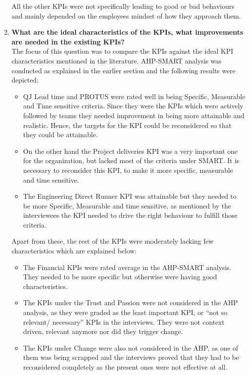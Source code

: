 \begin{enumerate}
All the other KPIs were not specifically leading to good or bad behaviours and mainly depended on the employees mindset of how they approach them.\\

\item \textbf{What are the ideal characteristics of the KPIs, what improvements are needed in the existing KPIs? }\\
The focus of this question was to compare the KPIs against the ideal KPI characteristics mentioned in the literature. AHP-SMART analysis was conducted as explained in the earlier section and the following results were depicted:
\begin{itemize}
    \item QJ Lead time and PROTUS were rated well in being Specific, Measurable and Time sensitive criteria. Since they were the KPIs which were actively followed by teams they needed improvement in being more attainable and realistic. Hence, the targets for the KPI could be reconsidered so that they could be attainable.
    \item On the other hand the Project deliveries KPI was a very important one for the organization, but lacked most of the criteria under SMART. It is necessary to reconsider this KPI, to make it more specific, measurable and time sensitive. 
    \item The Engineering Direct Runner KPI was attainable but they needed to be more Specific, Measurable and time sensitive, as mentioned by the interviewees the KPI needed to drive the right behaviour to fulfill those criteria.

\end{itemize}

Apart from these, the rest of the KPIs were moderately lacking few characteristics which are explained below:
\begin{itemize}
    \item The Financial KPIs were rated average in the AHP-SMART analysis. They needed to be more specific but otherwise were having good characteristics.
    \item The KPIs under the Trust and Passion were not considered in the AHP analysis, as they were graded as the least important KPI, or “not so relevant/ necessary” KPIs in the interviews. They were not context driven, relevant anymore nor did they trigger change. 
    \item The KPIs under Change were also not considered in the AHP, as one of them was being scrapped and the interviews proved that they had to be reconsidered completely as the present ones were not effective at all. 


\end{itemize}
\end{enumerate}
